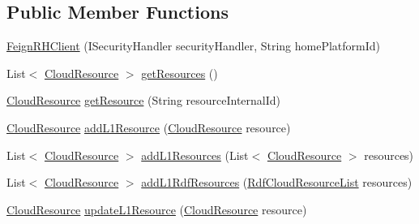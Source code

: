 \subsection*{Public Member Functions}
\begin{DoxyCompactItemize}
\item 
\hyperlink{classeu_1_1h2020_1_1symbiote_1_1client_1_1feign_1_1FeignRHClient_a7c8c876847e4cb50716115669056b2aa}{Feign\+R\+H\+Client} (I\+Security\+Handler security\+Handler, String home\+Platform\+Id)
\item 
List$<$ \hyperlink{classeu_1_1h2020_1_1symbiote_1_1cloud_1_1model_1_1internal_1_1CloudResource}{Cloud\+Resource} $>$ \hyperlink{classeu_1_1h2020_1_1symbiote_1_1client_1_1feign_1_1FeignRHClient_a25d731190f6d9fd35552ec93a55f721c}{get\+Resources} ()
\item 
\hyperlink{classeu_1_1h2020_1_1symbiote_1_1cloud_1_1model_1_1internal_1_1CloudResource}{Cloud\+Resource} \hyperlink{classeu_1_1h2020_1_1symbiote_1_1client_1_1feign_1_1FeignRHClient_afeca18b59c770a4ce9789f4d7cfd31ab}{get\+Resource} (String resource\+Internal\+Id)
\item 
\hyperlink{classeu_1_1h2020_1_1symbiote_1_1cloud_1_1model_1_1internal_1_1CloudResource}{Cloud\+Resource} \hyperlink{classeu_1_1h2020_1_1symbiote_1_1client_1_1feign_1_1FeignRHClient_a0e90096c4d28520a44ba0ea558027c54}{add\+L1\+Resource} (\hyperlink{classeu_1_1h2020_1_1symbiote_1_1cloud_1_1model_1_1internal_1_1CloudResource}{Cloud\+Resource} resource)
\item 
List$<$ \hyperlink{classeu_1_1h2020_1_1symbiote_1_1cloud_1_1model_1_1internal_1_1CloudResource}{Cloud\+Resource} $>$ \hyperlink{classeu_1_1h2020_1_1symbiote_1_1client_1_1feign_1_1FeignRHClient_a4a6cb7cbfb9a41cf85a18c62cf257b69}{add\+L1\+Resources} (List$<$ \hyperlink{classeu_1_1h2020_1_1symbiote_1_1cloud_1_1model_1_1internal_1_1CloudResource}{Cloud\+Resource} $>$ resources)
\item 
List$<$ \hyperlink{classeu_1_1h2020_1_1symbiote_1_1cloud_1_1model_1_1internal_1_1CloudResource}{Cloud\+Resource} $>$ \hyperlink{classeu_1_1h2020_1_1symbiote_1_1client_1_1feign_1_1FeignRHClient_aa15dbd07f234fb7b16db50309af8cd12}{add\+L1\+Rdf\+Resources} (\hyperlink{classeu_1_1h2020_1_1symbiote_1_1cloud_1_1model_1_1internal_1_1RdfCloudResourceList}{Rdf\+Cloud\+Resource\+List} resources)
\item 
\hyperlink{classeu_1_1h2020_1_1symbiote_1_1cloud_1_1model_1_1internal_1_1CloudResource}{Cloud\+Resource} \hyperlink{classeu_1_1h2020_1_1symbiote_1_1client_1_1feign_1_1FeignRHClient_a447837da729d2022e118cb22887d993d}{update\+L1\+Resource} (\hyperlink{classeu_1_1h2020_1_1symbiote_1_1cloud_1_1model_1_1internal_1_1CloudResource}{Cloud\+Resource} resource)

\end{DoxyCompactItemize}
